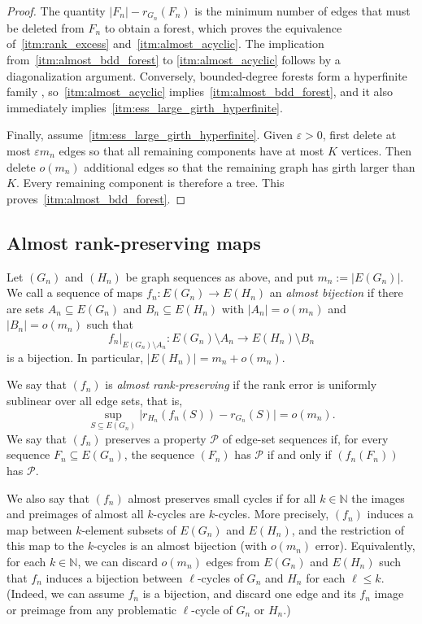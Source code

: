 \documentclass{article}
\theoremstyle{plain}
\theoremstyle{definition}
\newcommand{\N}{\mathbb{N}}
\newcommand{\cP}{\mathcal{P}}
\newcommand{\eps}{\varepsilon}
\begin{document}
\begin{proof}
The quantity $|F_n|-r_{G_n}(F_n)$ is the minimum number of edges that must be deleted from $F_n$ to obtain a forest, which proves the equivalence of~\ref{itm:rank_excess} and~\ref{itm:almost_acyclic}. The implication from~\ref{itm:almost_bdd_forest} to \ref{itm:almost_acyclic} follows by a diagonalization argument. 
Conversely, bounded-degree forests form a hyperfinite family
\cite[Section~1.2]{elek2012finite}, so~\ref{itm:almost_acyclic} implies~\ref{itm:almost_bdd_forest}, and it also immediately implies~\ref{itm:ess_large_girth_hyperfinite}.

Finally, assume~\ref{itm:ess_large_girth_hyperfinite}. Given $\eps>0$, first delete at most $\eps m_n$ edges so that all remaining components have at most $K$ vertices. Then delete $o(m_n)$ additional edges so that the remaining graph has girth larger than $K$. Every remaining component is therefore a tree. This proves~\ref{itm:almost_bdd_forest}.
\end{proof}

\subsection{Almost rank-preserving maps}

Let $(G_n)$ and $(H_n)$ be graph sequences as above, and put $m_n:=|E(G_n)|$. We call a sequence of maps $f_n:E(G_n)\to E(H_n)$ an \emph{almost bijection} if there are sets $A_n\subseteq E(G_n)$ and $B_n\subseteq E(H_n)$ with $|A_n|=o(m_n)$ and $|B_n|=o(m_n)$ such that
\[
    f_n\big|_{E(G_n)\setminus A_n}:E(G_n)\setminus A_n
    \longrightarrow E(H_n)\setminus B_n
\]
is a bijection. In particular, $|E(H_n)|=m_n+o(m_n)$.

We say that $(f_n)$ is \emph{almost rank-preserving} if the rank error is uniformly sublinear over all edge sets, that is,
\begin{equation}\label{eq:uniform-rank-error}
    \sup_{S\subseteq E(G_n)}
    \bigl|r_{H_n}(f_n(S))-r_{G_n}(S)\bigr|
    =o(m_n).
\end{equation}
We say that $(f_n)$ preserves a property $\cP$ of edge-set sequences if, for every sequence $F_n\subseteq E(G_n)$, the sequence $(F_n)$ has $\cP$ if and only if $(f_n(F_n))$ has $\cP$.

We also say that $(f_n)$ almost preserves small cycles if for all $k\in\N$ the images and preimages of almost all $k$-cycles are $k$-cycles. More precisely, $(f_n)$ induces a map between $k$-element subsets of $E(G_n)$ and $E(H_n)$, and the restriction of this map to the $k$-cycles is an almost bijection (with $o(m_n)$ error). Equivalently, for each $k\in \N$, we can discard $o(m_n)$ edges from $E(G_n)$ and $E(H_n)$ such that $f_n$ induces a bijection between $\ell$-cycles of $G_n$ and $H_n$ for each $\ell \leq k$. (Indeed, we can assume $f_n$ is a bijection, and discard one edge and its $f_n$ image or preimage from any problematic $\ell$-cycle of $G_n$ or $H_n$.)
\end{document}
